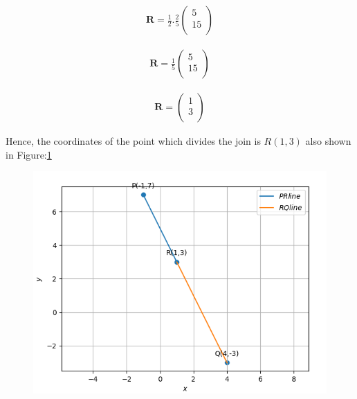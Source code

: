 \documentclass[12pt]{article}
\providecommand{\brak}[1]{\ensuremath{\left(#1\right)}}
\newcommand{\myvec}[1]{\ensuremath{\begin{pmatrix}#1\end{pmatrix}}}
\let\vec\mathbf
\begin{document}
\begin{align}
\vec{R}=\frac{1}{2} . \frac{2}{5}\myvec{
5\\
15\\
}
\end{align}

\begin{align}
\vec{R}=\frac{1}{5} \myvec{
5\\
15\\
}
\end{align}


\begin{align}
\vec{R}=\myvec{
1\\
3\\
}
\end{align}





Hence, the coordinates of the point which divides the join is $R\brak{1,3}$ also shown in Figure:\ref{fig:Fig}


\begin{figure}[!h]
\begin{center}
   \includegraphics[width=\columnwidth]{./figs/linefig.png}
\end{center}
\caption{}
\label{fig:Fig}
\end{figure}
\end{document}
